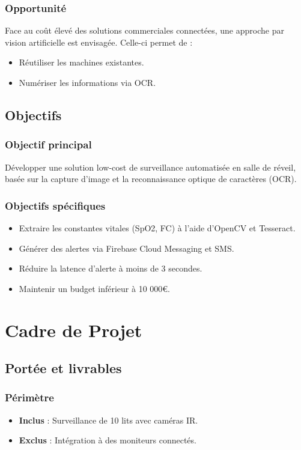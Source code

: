 \subsection{Opportunité}
Face au coût élevé des solutions commerciales connectées, une approche par vision artificielle est envisagée. Celle-ci permet de :
\begin{itemize}
  \item Réutiliser les machines existantes.
  \item Numériser les informations via OCR.
\end{itemize}

\section{Objectifs}
\subsection{Objectif principal}
Développer une solution low-cost de surveillance automatisée en salle de réveil, basée sur la capture d’image et la reconnaissance optique de caractères (OCR).

\subsection{Objectifs spécifiques}
\begin{itemize}
  \item Extraire les constantes vitales (SpO2, FC) à l’aide d’OpenCV et Tesseract.
  \item Générer des alertes via Firebase Cloud Messaging et SMS.
  \item Réduire la latence d’alerte à moins de 3 secondes.
  \item Maintenir un budget inférieur à 10 000€.
\end{itemize}

\chapter{Cadre de Projet}

\section{Portée et livrables}
\subsection{Périmètre}
\begin{itemize}
  \item \textbf{Inclus} : Surveillance de 10 lits avec caméras IR.
  \item \textbf{Exclus} : Intégration à des moniteurs connectés.
\end{itemize}

